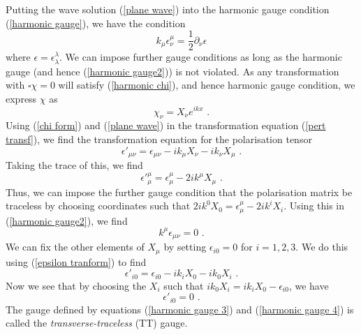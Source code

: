 \documentclass[11pt]{cuthesis}
\newcommand{\mn}{_{\mu\nu}}
\newcommand{\fs}{\text{ .}}
\begin{document}
Putting the wave solution (\ref{plane wave}) into the harmonic gauge condition (\ref{harmonic gauge}), we have the condition
\begin{equation}  \label{harmonic gauge2}
k_\mu \epsilon^\mu_\nu = \frac{1}{2}\partial_\nu \epsilon
\end{equation}
where $\epsilon=\epsilon^\lambda_\lambda$. We can impose further gauge conditions as long as the harmonic gauge (and hence (\ref{harmonic gauge2})) is not violated. As any transformation with $\square \chi = 0$ will satisfy (\ref{harmonic chi}), and hence harmonic gauge condition, we express $\chi$ as 
\begin{equation} \label{chi form}
\chi_\nu = X_\nu e^{ikx} \fs
\end{equation}
Using (\ref{chi form}) and (\ref{plane wave}) in the transformation equation (\ref{pert transf}), we find the transformation equation for the polarisation tensor
\begin{equation} \label{epsilon tranform}
\epsilon'\mn = \epsilon\mn -ik_\mu X_\nu - ik_\nu X_\mu \fs
\end{equation}
Taking the trace of this, we find
\begin{equation}
\epsilon'^\mu_\mu = \epsilon^\mu_\mu - 2ik^\mu X_\mu \fs
\end{equation}
Thus, we can impose the further gauge condition that the polarisation matrix be traceless by choosing coordinates such that $2ik^0 X_0 = \epsilon^\mu_\mu - 2ik^i X_i$. Using this in (\ref{harmonic gauge2}), we find
\begin{equation} \label{harmonic gauge 3}
k^\mu \epsilon\mn = 0 \fs
\end{equation}
We can fix the other elements of $X_\mu$ by setting $\epsilon_{i 0} = 0$ for $i=1,2,3$. We do this using (\ref{epsilon tranform}) to find
\begin{equation} \label{epsilon 0}
\epsilon'_{i 0} = \epsilon_{i 0} -ik_i X_0 - ik_0 X_i \fs
\end{equation}
Now we see that by choosing the $X_i$ such that $ ik_0 X_i = ik_i X_0 - \epsilon_{i 0}$, we have
\begin{equation}  \label{harmonic gauge 4}
\epsilon'_{i 0} = 0 \fs
\end{equation}
The gauge defined by equations (\ref{harmonic gauge 3}) and (\ref{harmonic gauge 4}) is called the \textit{transverse-traceless} (TT) gauge.

\end{document}
